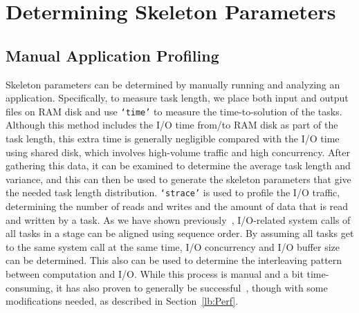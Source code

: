 \documentclass[preprint,12pt]{elsarticle}
\newcommand{\katznote}[1]{ {\textcolor{blue}    { ***Dan:   #1 }}}
\newcommand{\zhaonote}[1]{{\textcolor{darkgreen}{ ***Zhao:  #1 }}}
\newcommand{\katznote}[1]{}
\newcommand{\zhaonote}[1]{}
\newcommand{\T}[1]{\texttt{#1}\xspace}
\begin{document}
%

\section{Determining Skeleton Parameters}
\label{lb:Params}

\subsection{Manual Application Profiling}
\label{sec:manual-profiling}

Skeleton parameters can be determined by manually running and analyzing an application.
Specifically, to measure task length, we place both input
and output files on RAM disk and use \T{`time'} to measure the time-to-solution of the tasks.
Although this method includes the I/O
time from/to RAM disk as part of the task length, this extra time is generally negligible
compared with the I/O time using shared disk, which involves
high-volume traffic and high concurrency.
After gathering this data, it can be examined to determine
the average task length and variance, and this can then be used to generate the skeleton
parameters that give the needed task length distribution.
\T{`strace'} is used to profile the I/O traffic, determining the number of reads and writes
and the amount of data
that is read and written by a task.
As we have shown previously~\cite{ENVELOPE}, I/O-related system calls
of all tasks in a stage can be aligned using sequence order. By assuming all tasks get to the
same system call at the same time, I/O concurrency and I/O buffer size can be determined.
This also can be used to determine the interleaving pattern between computation and I/O.  
While this process is manual and a bit time-consuming, it
has also proven to generally be successful~\cite{Skeleton2014}, though with some modifications needed, as described in Section~\ref{lb:Perf}.
\end{document}
